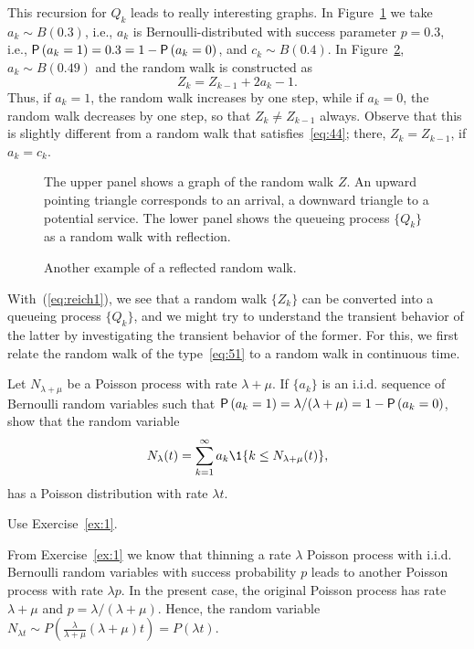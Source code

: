 This recursion for $Q_k$ leads to really interesting graphs. In Figure~\ref{fig:random_bernoulli}
 we take $a_k \sim B(0.3)$, i.e., $a_k$ is Bernoulli-distributed with success
parameter $p=0.3$, i.e., $\P{a_k = 1} = 0.3 = 1- \P{a_k=0}$, and
$c_k \sim B(0.4)$. In Figure~\ref{fig:random_walk},  $a_k\sim B(0.49)$ and
the random walk is constructed as
\begin{equation}\label{eq:51}
  Z_k = Z_{k-1} + 2 a_k -1.
\end{equation}
Thus, if $a_k=1$, the random walk increases by one step, while if $a_k=0$, the random walk decreases by one step, so that $Z_k \neq Z_{k-1}$  always. Observe that this is slightly different from a random walk that satisfies~\eqref{eq:44}; there, $Z_{k}=Z_{k-1}$, if $a_k=c_k$.


\begin{figure}[ht]
  \centering

%
\caption{The upper panel shows a graph of the random walk $Z$. An
  upward pointing triangle corresponds to an arrival, a downward
  triangle to a potential service. The lower panel shows the queueing
  process $\{Q_k\}$ as a random walk with reflection.}
\label{fig:random_bernoulli}
\end{figure}

\begin{figure}[ht]
  \centering

\caption{Another example of a reflected random walk.}
\label{fig:random_walk}
\end{figure}


With~(\ref{eq:reich1}),  we see that a random walk $\{Z_k\}$ can be converted into a queueing
process $\{Q_k\}$, and we might try to understand the transient behavior of the latter by investigating the transient behavior of the former.  For this, we first relate the random walk of the type~\eqref{eq:51} to a random walk in continuous time. 

\begin{exercise}
  Let $N_{\lambda+\mu}$ be a Poisson process with rate $\lambda+\mu$. If $\{a_k\}$ is an i.i.d. sequence of Bernoulli random variables such that $\P{a_k=1} = \lambda/(\lambda+\mu)=1-\P{a_k=0}$, show that the random variable
  \begin{equation*}
    N_\lambda(t) = \sum_{k=1}^\infty a_k \1{k \leq N_{\lambda+\mu}(t)},
  \end{equation*}
has a Poisson distribution with rate $\lambda t$. 
\begin{hint}
Use Exercise~\ref{ex:1}.
\end{hint}
\begin{solution}
  From Exercise~\ref{ex:1} we know that thinning  a rate $\lambda$ Poisson process  with i.i.d. Bernoulli random variables with success probability $p$  leads to another Poisson process with rate $\lambda p$. In the present case, the original Poisson process has rate $\lambda+\mu$ and $p=\lambda/(\lambda+\mu)$. Hence, the random variable $N_{\lambda t}\sim P\left(\frac\lambda{\lambda+\mu} (\lambda+\mu)t\right) = P(\lambda t)$.
\end{solution}
\end{exercise}

